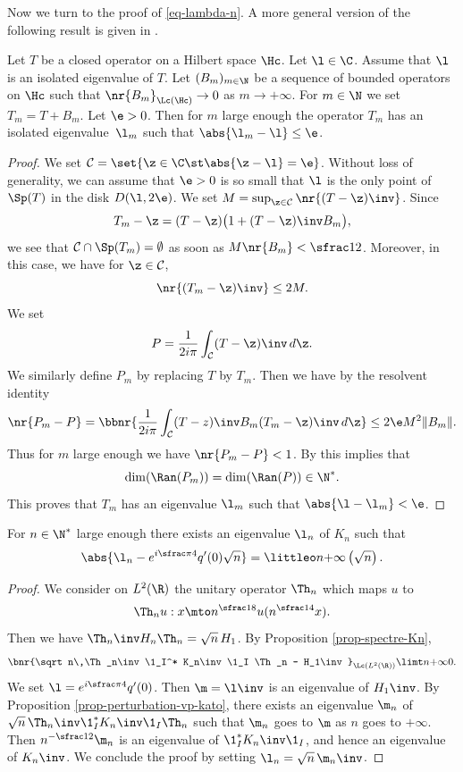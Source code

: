 Now we turn to the proof of \eqref{eq-lambda-n}. A more general version of the following result is given in \cite[\S IV.3.5]{kato}.

\begin{proposition} \label{prop-perturbation-vp-kato}
Let $T$ be a closed operator on a Hilbert space $\Hc$. Let $\l \in \C$. Assume that $\l$ is an isolated eigenvalue of $T$. Let $(B_m)_{m \in \N}$ be a sequence of bounded operators on $\Hc$ such that $\nr{B_m}_{\Lc(\Hc)} \to 0$ as $m \to +\infty$. For $m \in \N$ we set \hbox{$T_m = T+B_m$}. Let $\e > 0$. Then for $m$ large enough the operator $T_m$ has an isolated eigenvalue~$\l_m$ such that $\abs{\l_m-\l} \leq \e$.
\end{proposition}

\begin{proof}
We set $\mathcal C = \set {\z \in \C\st \abs {\z - \l} = \e}$. Without loss of generality, we can assume that $\e> 0$ is so small that $\l$ is the only point of $\Sp(T)$ in the disk $D(\l,2\e)$. We set $M = \sup_{\z \in \mathcal C} \nr{(T-\z)\inv}$. Since
\[
T_m - \z = (T-\z) \bigl(1 + (T-\z)\inv B_m \bigr),
\]
we see that $\mathcal C \cap \Sp(T_m) = \emptyset$ as soon as $M \nr{B_m} < \sfrac 1 2$. Moreover, in this case, we have for $\z \in \mathcal C$,
\[
\nr{(T_m-\z)\inv} \leq 2 M.
\]
We set
\[
P = \frac 1 {2i\pi} \int_{\mathcal C} (T-\z)\inv \, d\z.
\]
We similarly define $P_m$ by replacing $T$ by $T_m$. Then we have by the resolvent identity
\[
\nr{P_m - P} = \bbnr{\frac 1 {2i\pi} \int_{\mathcal C} (T-z)\inv B_m (T_m-\z)\inv \, d\z} \leq 2\e M^2 \Vert B_m \Vert.
\]
Thus for $m$ large enough we have $\nr{P_m - P} < 1$. By \cite[\S I.4.6]{kato} this implies that
\[
\dim (\Ran (P_m)) = \dim (\Ran (P)) \in \N^*.
\]
This proves that $T_m$ has an eigenvalue $\l_m$ such that $\abs{\l - \l_m} < \e$.
\end{proof}

\begin{proposition} \label{prop-lambda-n}
For $n \in \N^*$ large enough there exists an eigenvalue $\l_n$ of $K_n$ such that
\[
\abs{\l_n -e^{i\sfrac \pi 4} q'(0) \sqrt n } = \littleo n {+\infty} \left(\sqrt n \right).
\]
\end{proposition}

\begin{proof}
We consider on $L^2(\R)$ the unitary operator $\Th_n$ which maps $u$ to
\[
\Th_n u : x \mto n^{\sfrac 18} u(n^{\sfrac 14} x).
\]
Then we have $\Th_n\inv H_n \Th_n = \sqrt n\,H_1$. By Proposition \ref{prop-spectre-Kn},
\[
\bnr{\sqrt n\,\Th_n\inv \1_I^* K_n\inv \1_I \Th_n - H_1\inv}_{\Lc(L^2(\R))} \limt n {+\infty} 0.
\]
We set $\l = e^{i\sfrac \pi 4} q'(0)$. Then $\m = \l\inv$ is an eigenvalue of $H_1\inv$. By Proposition \ref{prop-perturbation-vp-kato}, there exists an eigenvalue $\m_n$ of $\sqrt n\,\Th_n\inv \1_I^* K_n \inv \1_I \Th_n$ such that $\m_n$ goes to $\m$ as $n$ goes to $+\infty$. Then $n^{-\sfrac 12} \m_n$ is an eigenvalue of $\1_I^* K_n\inv \1_I$, and hence an eigenvalue of $K_n\inv$. We conclude the proof by setting $\l_n = \sqrt n\,\m_n\inv$.
\end{proof}

